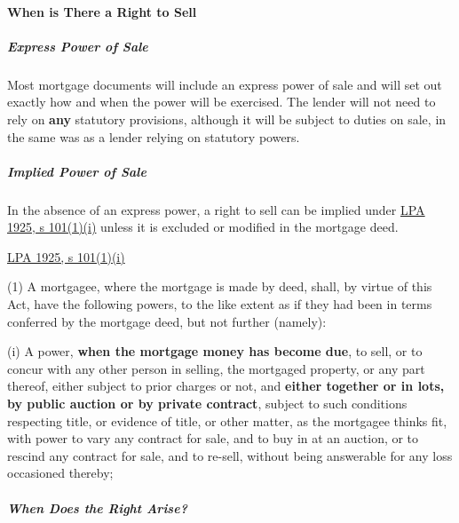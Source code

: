 \documentclass[
]{article}
\newenvironment{env-9843ce55-0506-497d-95ba-03a690b05b3c}
{
    \savenotes\tcolorbox[blanker,breakable,left=5pt,borderline west={2pt}{-4pt}{green}]
}
{
    \endtcolorbox\spewnotes
}
\begin{document}
\hypertarget{when-is-there-a-right-to-sell}{%
\paragraph{When is There a Right to
Sell}\label{when-is-there-a-right-to-sell}}

\hypertarget{express-power-of-sale}{%
\subparagraph{Express Power of Sale}\label{express-power-of-sale}}

Most mortgage documents will include an express power of sale and will
set out exactly how and when the power will be exercised. The lender
will not need to rely on \textbf{any} statutory provisions, although it
will be subject to duties on sale, in the same was as a lender relying
on statutory powers.

\hypertarget{implied-power-of-sale}{%
\subparagraph{Implied Power of Sale}\label{implied-power-of-sale}}

In the absence of an express power, a right to sell can be implied under
\href{https://www.legislation.gov.uk/ukpga/Geo5/15-16/20/section/101}{LPA
1925, s 101(1)(i)} unless it is excluded or modified in the mortgage
deed.

\begin{env-9843ce55-0506-497d-95ba-03a690b05b3c}

\href{https://www.legislation.gov.uk/ukpga/Geo5/15-16/20/section/101}{LPA
1925, s 101(1)(i)}

(1) A mortgagee, where the mortgage is made by deed, shall, by virtue of
this Act, have the following powers, to the like extent as if they had
been in terms conferred by the mortgage deed, but not further (namely):

(i) A power, \textbf{when the mortgage money has become due}, to sell,
or to concur with any other person in selling, the mortgaged property,
or any part thereof, either subject to prior charges or not, and
\textbf{either together or in lots, by public auction or by private
contract}, subject to such conditions respecting title, or evidence of
title, or other matter, as the mortgagee thinks fit, with power to vary
any contract for sale, and to buy in at an auction, or to rescind any
contract for sale, and to re-sell, without being answerable for any loss
occasioned thereby;

\end{env-9843ce55-0506-497d-95ba-03a690b05b3c}

\hypertarget{when-does-the-right-arise}{%
\subparagraph{When Does the Right
Arise?}\label{when-does-the-right-arise}}
\end{document}
